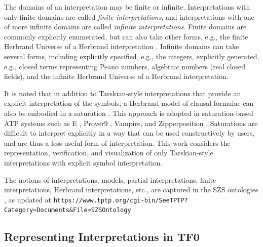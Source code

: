 \documentclass[letterpaper]{article}
\newcommand{\smalltt}[1]{\small \texttt{#1}}
\begin{document}
The domains of an interpretation may be finite or infinite.
Interpretations with only finite domains are called {\em finite interpretations}, and
interpretations with one of more infinite domains are called {\em infinite interpretations}.
Finite domains are commonly explicitly enumerated, but can also take other forms, e.g., the 
finite Herbrand Universe of a Herbrand interpretation \cite{Her30}.
Infinite domains can take several forms, including explicitly specified, e.g., the integers,
explicitly generated, e.g., closed terms representing Peano numbers, algebraic numbers (real
closed fields), and the infinite Herbrand Universe of a Herbrand interpretation.

It is noted that in addition to Tarskian-style interpretations that provide an explicit
interpretation of the symbols, a Herbrand model of clausal formulae can also be embodied in a 
saturation \cite{BG+01}.
This approach is adopted in saturation-based ATP systems such as E \cite{SCV19}, 
Prover9 \cite{McC-Prover9-URL}, Vampire, and Zipperposition \cite{VB+21}.
Saturations are difficult to interpret explicitly in a way that can be used constructively by 
users, and are thus a less useful form of interpretation.
This work considers the representation, verification, and visualization of only Tarskian-style 
interpretations with explicit symbol interpretation.

The notions of interpretations, models, partial interpretations, finite interpretations,
Herbrand interpretations, etc., are captured in the SZS ontologies \cite{Sut08-KEAPPA}, as
updated at 
\smalltt{https://www.tptp.org/cgi-bin/SeeTPTP?\allowbreak Category=Documents\&File=SZSOntology}

 
\subsection{Representing Interpretations in TF0}
\label{InterpretationsTF0}
\end{document}
